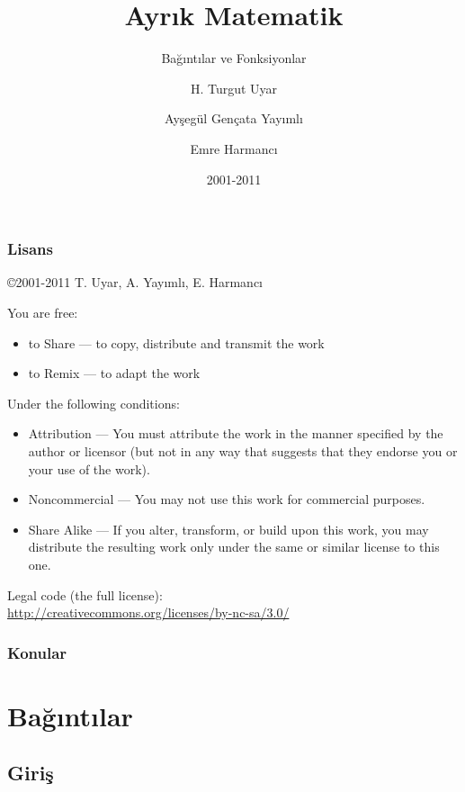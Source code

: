 \documentclass[dvipsnames]{beamer}
\title{Ayrık Matematik}
\subtitle{Bağıntılar ve Fonksiyonlar}
\author{H. Turgut Uyar \and Ayşegül Gençata Yayımlı \and Emre Harmancı}
\date{2001-2011}
\theoremstyle{definition}
\theoremstyle{example}
\theoremstyle{plain}
\begin{document}
\begin{frame}
  \titlepage
\end{frame}

\begin{frame}
  \frametitle{Lisans}

  \hfill
  \copyright 2001-2011 T. Uyar, A. Yayımlı, E. Harmancı

  \vfill
  \begin{tiny}
    You are free:
    \begin{itemize}
      \item to Share — to copy, distribute and transmit the work
      \item to Remix — to adapt the work
    \end{itemize}

    Under the following conditions:
    \begin{itemize}
      \item Attribution — You must attribute the work in the manner specified by
        the author or licensor (but not in any way that suggests that they
        endorse you or your use of the work).

      \item Noncommercial — You may not use this work for commercial purposes.

      \item Share Alike — If you alter, transform, or build upon this work, you
        may distribute the resulting work only under the same or similar license
        to this one.
    \end{itemize}
  \end{tiny}

  \vfill
  Legal code (the full license):\\
  \url{http://creativecommons.org/licenses/by-nc-sa/3.0/}
\end{frame}

\begin{frame}
  \frametitle{Konular}
  \tableofcontents
\end{frame}

\section{Bağıntılar}

\subsection{Giriş}
\end{document}
